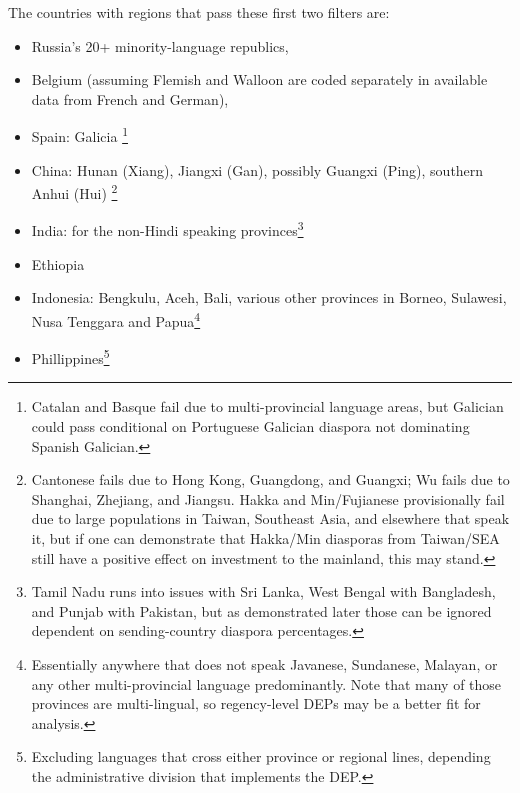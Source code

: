 \documentclass[doublespace,nopageskip]{UVAthesis}
\begin{document}
    The countries with regions that pass these first two filters are:
\begin{itemize}
    \item Russia's 20+ minority-language republics,
    \item Belgium (assuming Flemish and Walloon are coded separately in available data from French and German),
    \item Spain: Galicia \footnote{Catalan and Basque fail due to multi-provincial language areas, but Galician could pass conditional on Portuguese Galician diaspora not dominating Spanish Galician.}
    \item China: Hunan (Xiang), Jiangxi (Gan), possibly Guangxi (Ping), southern Anhui (Hui) \footnote{Cantonese fails due to Hong Kong, Guangdong, and Guangxi; Wu fails due to Shanghai, Zhejiang, and Jiangsu. Hakka and Min/Fujianese provisionally fail due to large populations in Taiwan, Southeast Asia, and elsewhere that speak it, but if one can demonstrate that Hakka/Min diasporas from Taiwan/SEA still have a positive effect on investment to the mainland, this may stand.}
    \item India: for the non-Hindi speaking provinces\footnote{Tamil Nadu runs into issues with Sri Lanka, West Bengal with Bangladesh, and Punjab with Pakistan, but as demonstrated later those can be ignored dependent on sending-country diaspora percentages.} 
    \item Ethiopia
    \item Indonesia: Bengkulu, Aceh, Bali, various other provinces in Borneo, Sulawesi, Nusa Tenggara and Papua\footnote{Essentially anywhere that does not speak Javanese, Sundanese, Malayan, or any other multi-provincial language predominantly. Note that many of those provinces are multi-lingual, so regency-level DEPs may be a better fit for analysis.}
    \item Phillippines\footnote{Excluding languages that cross either province or regional lines, depending the administrative division that implements the DEP.}
\end{itemize}
\end{document}
